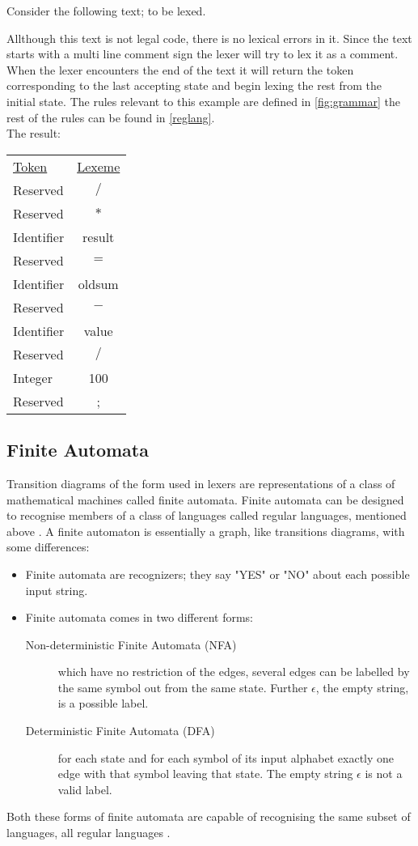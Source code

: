 \begin{example} \label{longestMatch}
Consider the following text; to be lexed.

Allthough this text is not legal code, there is no lexical errors in it. Since
the text starts with a multi line comment sign the lexer will try to lex it as
a comment. When the lexer encounters the end of the text it will return the
token corresponding to the last accepting state and begin lexing the rest from
the initial state. The rules relevant to this example are defined in 
\cref{fig:grammar} the rest of the rules can be found in \cref{reglang}.\\
The result:
\begin{center}
\begin{tabular}{l c}
\underline{Token} & \underline{Lexeme}\\
Reserved & $/$\\
Reserved & $*$\\
Identifier & result\\
Reserved & $=$\\
Identifier & oldsum\\
Reserved & $-$\\
Identifier & value\\
Reserved & $/$\\
Integer & 100\\
Reserved & ;
\end{tabular}
\end{center}
\end{example}

\subsection{Finite Automata}
Transition diagrams of the form used in lexers are representations of a class 
of mathematical machines called finite automata. Finite automata can be 
designed to recognise members of a class of languages called regular languages, 
mentioned above \cite{sebesta2012}.
A finite automaton is essentially a graph, like transitions diagrams, with some 
differences:
\begin{itemize}
  \item Finite automata are recognizers; they say "YES" or "NO" about 
each possible input string.
  \item Finite automata comes in two different forms:
    \begin{description}
      \item [Non-deterministic Finite Automata (NFA)] which have no restriction 
of the edges, several edges can be labelled by the same symbol out from the 
same state. Further $\epsilon$, the empty string, is a possible label. 
      \item [Deterministic Finite Automata (DFA)] for each state and for each 
symbol of its input alphabet exactly one edge with that symbol leaving that 
state. The empty string $\epsilon$ is not a valid label.
    \end{description}
\end{itemize}
Both these forms of finite automata are capable of recognising the same 
subset of languages, all regular languages \cite{Aho2006}.

